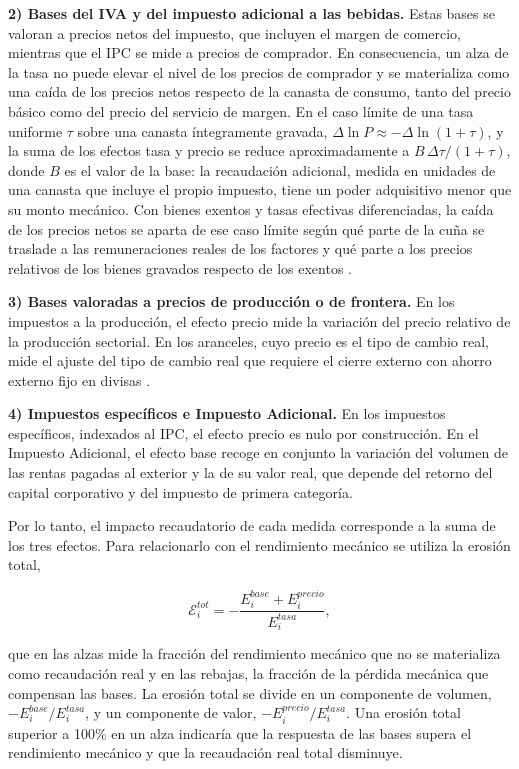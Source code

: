 \documentclass[11pt]{article}
\begin{document}
\textbf{2) Bases del IVA y del impuesto adicional a las bebidas.} Estas bases se valoran a precios netos del impuesto, que incluyen el margen de comercio, mientras que el IPC se mide a precios de comprador. En consecuencia, un alza de la tasa no puede elevar el nivel de los precios de comprador y se materializa como una caída de los precios netos respecto de la canasta de consumo, tanto del precio básico como del precio del servicio de margen. En el caso límite de una tasa uniforme $\tau$ sobre una canasta íntegramente gravada, $\Delta\ln P\approx-\Delta\ln(1+\tau)$, y la suma de los efectos tasa y precio se reduce aproximadamente a $B\,\Delta\tau/(1+\tau)$, donde $B$ es el valor de la base: la recaudación adicional, medida en unidades de una canasta que incluye el propio impuesto, tiene un poder adquisitivo menor que su monto mecánico. Con bienes exentos y tasas efectivas diferenciadas, la caída de los precios netos se aparta de ese caso límite según qué parte de la cuña se traslade a las remuneraciones reales de los factores y qué parte a los precios relativos de los bienes gravados respecto de los exentos \cite{atkinson_stiglitz_1980,fullerton_metcalf_2002}.

\textbf{3) Bases valoradas a precios de producción o de frontera.} En los impuestos a la producción, el efecto precio mide la variación del precio relativo de la producción sectorial. En los aranceles, cuyo precio es el tipo de cambio real, mide el ajuste del tipo de cambio real que requiere el cierre externo con ahorro externo fijo en divisas \cite{dervis_demelo_robinson_1982}.

\textbf{4) Impuestos específicos e Impuesto Adicional.} En los impuestos específicos, indexados al IPC, el efecto precio es nulo por construcción. En el Impuesto Adicional, el efecto base recoge en conjunto la variación del volumen de las rentas pagadas al exterior y la de su valor real, que depende del retorno del capital corporativo y del impuesto de primera categoría.

Por lo tanto, el impacto recaudatorio de cada medida corresponde a la suma de los tres efectos. Para relacionarlo con el rendimiento mecánico se utiliza la erosión total,

\[
\mathcal{E}_i^{tot}=-\frac{E_i^{base}+E_i^{precio}}{E_i^{tasa}},
\]

que en las alzas mide la fracción del rendimiento mecánico que no se materializa como recaudación real y en las rebajas, la fracción de la pérdida mecánica que compensan las bases. La erosión total se divide en un componente de volumen, $-E_i^{base}/E_i^{tasa}$, y un componente de valor, $-E_i^{precio}/E_i^{tasa}$. Una erosión total superior a 100\% en un alza indicaría que la respuesta de las bases supera el rendimiento mecánico y que la recaudación real total disminuye.
\end{document}
